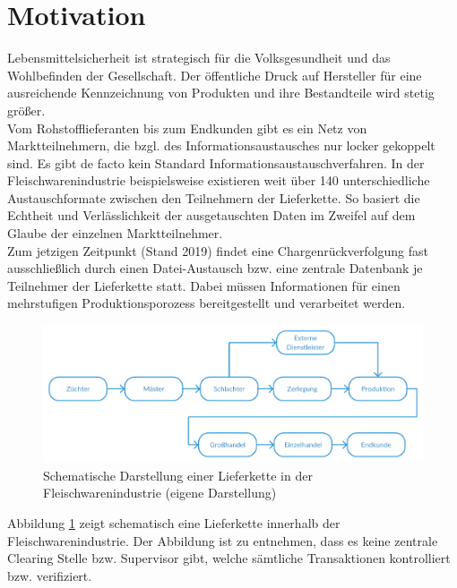 \section{Motivation}

Lebensmittelsicherheit ist strategisch für die Volksgesundheit und das Wohlbefinden der Gesellschaft. Der öffentliche Druck auf Hersteller für eine ausreichende Kennzeichnung von Produkten und ihre Bestandteile wird stetig größer.\cite[vgl.]{EU2002}\\

Vom Rohstofflieferanten bis zum Endkunden gibt es ein Netz von Marktteilnehmern, die bzgl. des Informationsaustausches nur locker gekoppelt sind. Es gibt de facto kein Standard Informationsaustauschverfahren. In der Fleischwarenindustrie beispielsweise existieren weit über 140 unterschiedliche Austauschformate zwischen den Teilnehmern der Lieferkette. So basiert die Echtheit und Verlässlichkeit der ausgetauschten Daten im Zweifel auf dem Glaube der einzelnen Marktteilnehmer.\\

Zum jetzigen Zeitpunkt (Stand 2019) findet eine Chargenrückverfolgung fast ausschließlich durch einen Datei-Austausch bzw. eine zentrale Datenbank je Teilnehmer der Lieferkette statt. Dabei müssen Informationen für einen mehrstufigen Produktionsporozess bereitgestellt und verarbeitet werden.\\

\begin{figure}[h!]
	\centering
	\includegraphics[width=1.0\linewidth]{pictures/Lieferkette-schematisch}
	\caption[Schematische Darstellung einer Lieferkette in der Fleischwarenindustrie]{Schematische Darstellung einer Lieferkette in der Fleischwarenindustrie\cite[vgl.]{CIOWSCE2019} (eigene Darstellung)}
	\label{fig:lieferkette-schematisch}
\end{figure}

Abbildung \ref{fig:lieferkette-schematisch} zeigt schematisch eine Lieferkette innerhalb der Fleischwarenindustrie. Der Abbildung ist zu entnehmen, dass es keine zentrale \glqq Clearing Stelle\grqq{} bzw. Supervisor gibt, welche sämtliche Transaktionen kontrolliert bzw. verifiziert.\\

